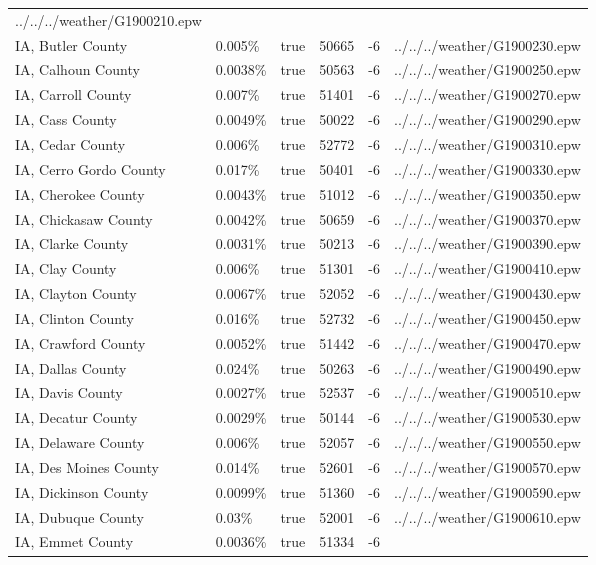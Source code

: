\begin{longtable}[]{@{}llllll@{}}
../../../weather/G1900210.epw \\
IA, Butler County & 0.005\% & true & 50665 & -6 &
../../../weather/G1900230.epw \\
IA, Calhoun County & 0.0038\% & true & 50563 & -6 &
../../../weather/G1900250.epw \\
IA, Carroll County & 0.007\% & true & 51401 & -6 &
../../../weather/G1900270.epw \\
IA, Cass County & 0.0049\% & true & 50022 & -6 &
../../../weather/G1900290.epw \\
IA, Cedar County & 0.006\% & true & 52772 & -6 &
../../../weather/G1900310.epw \\
IA, Cerro Gordo County & 0.017\% & true & 50401 & -6 &
../../../weather/G1900330.epw \\
IA, Cherokee County & 0.0043\% & true & 51012 & -6 &
../../../weather/G1900350.epw \\
IA, Chickasaw County & 0.0042\% & true & 50659 & -6 &
../../../weather/G1900370.epw \\
IA, Clarke County & 0.0031\% & true & 50213 & -6 &
../../../weather/G1900390.epw \\
IA, Clay County & 0.006\% & true & 51301 & -6 &
../../../weather/G1900410.epw \\
IA, Clayton County & 0.0067\% & true & 52052 & -6 &
../../../weather/G1900430.epw \\
IA, Clinton County & 0.016\% & true & 52732 & -6 &
../../../weather/G1900450.epw \\
IA, Crawford County & 0.0052\% & true & 51442 & -6 &
../../../weather/G1900470.epw \\
IA, Dallas County & 0.024\% & true & 50263 & -6 &
../../../weather/G1900490.epw \\
IA, Davis County & 0.0027\% & true & 52537 & -6 &
../../../weather/G1900510.epw \\
IA, Decatur County & 0.0029\% & true & 50144 & -6 &
../../../weather/G1900530.epw \\
IA, Delaware County & 0.006\% & true & 52057 & -6 &
../../../weather/G1900550.epw \\
IA, Des Moines County & 0.014\% & true & 52601 & -6 &
../../../weather/G1900570.epw \\
IA, Dickinson County & 0.0099\% & true & 51360 & -6 &
../../../weather/G1900590.epw \\
IA, Dubuque County & 0.03\% & true & 52001 & -6 &
../../../weather/G1900610.epw \\
IA, Emmet County & 0.0036\% & true & 51334 & -6 &

\end{longtable}
